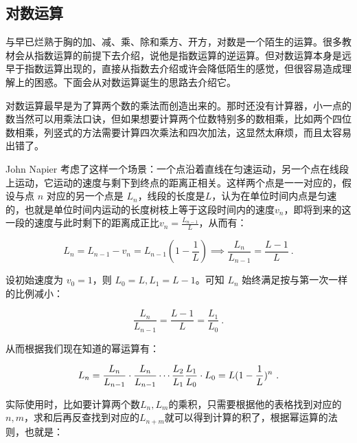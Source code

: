 \begin{issues}
\issueDraft
\end{issues}
\subsection{对数运算}

与早已烂熟于胸的加、减、乘、除和乘方、开方，对数是一个陌生的运算。很多教材会从指数运算的前提下去介绍，说他是指数运算的逆运算。但对数运算本身是远早于指数运算出现的，直接从指数去介绍或许会降低陌生的感觉，但很容易造成理解上的困惑。下面会从对数运算诞生的思路去介绍它。

对数运算最早是为了算两个数的乘法而创造出来的。那时还没有计算器，小一点的数当然可以用乘法口诀，但如果想要计算两个位数特别多的数相乘，比如两个四位数相乘，列竖式的方法需要计算四次乘法和四次加法，这显然太麻烦，而且太容易出错了。

John Napier 考虑了这样一个场景：一个点沿着直线在匀速运动，另一个点在线段上运动，它运动的速度与剩下到终点的距离正相关。这样两个点是一一对应的，假设与点 $n$ 对应的另一个点是 $L_n$，线段的长度是$L$，认为在单位时间内点是匀速的，也就是单位时间内运动的长度树枝上等于这段时间内的速度$v_n$，即将到来的这一段的速度与此时剩下的距离成正比$\displaystyle v_{n}=\frac{L_{n-1}}{L}$，从而有：

\begin{equation}
L_{n}=L_{n-1}-v_{n}=L_{n-1}(1-\frac{1}{L})\implies\frac{L_{n}}{L_{n-1}}= \frac{L-1}{L}~.
\end{equation}

设初始速度为 $v_0=1$，则 $L_{0}=L,L_{1}=L-1$。可知 $L_n$ 始终满足按与第一次一样的比例减小：

\begin{equation}
\frac{L_{n}}{L_{n-1}}= \frac{L-1}{L}=\frac{L_1}{L_{0}}~.
\end{equation}


从而根据我们现在知道的幂运算有：

\begin{equation}\label{eq_Ln_1}
L_n={L_{n}\over L_{n-1}}\cdot{L_{n}\over L_{n-1}}\cdots{L_{2}\over L_{1}}{L_{1}\over L_{0}}\cdot L_0=L(1 - \frac{1}{L})^n~.
\end{equation}

实际使用时，比如要计算两个数$L_n,L_m$的乘积，只需要根据他的表格找到对应的$n,m$，求和后再反查找到对应的$L_{n+m}$就可以得到计算的积了，根据幂运算的法则，也就是：

